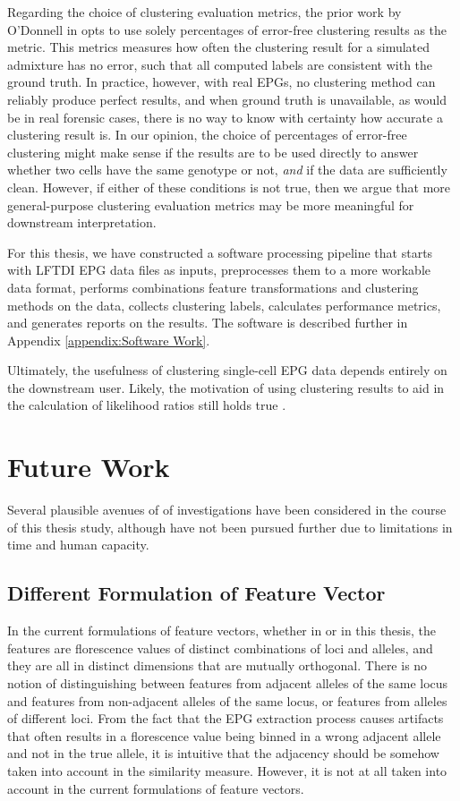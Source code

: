 Regarding the choice of clustering evaluation metrics, the prior work by O'Donnell in \cite{odonnell_clustering_2021} opts to use solely percentages of error-free clustering results as the metric. This metrics measures how often the clustering result for a simulated admixture has no error, such that all computed labels are consistent with the ground truth. In practice, however, with real EPGs, no clustering method can reliably produce perfect results, and when ground truth is unavailable, as would be in real forensic cases, there is no way to know with certainty how accurate a clustering result is. In our opinion, the choice of percentages of error-free clustering might make sense if the results are to be used directly to answer whether two cells have the same genotype or not, \emph{and} if the data are sufficiently clean. However, if either of these conditions is not true, then we argue that more general-purpose clustering evaluation metrics may be more meaningful for downstream interpretation.

For this thesis, we have constructed a software processing pipeline that starts with LFTDI EPG data files as inputs, preprocesses them to a more workable data format, performs combinations feature transformations and clustering methods on the data, collects clustering labels, calculates performance metrics, and generates reports on the results. The software is described further in Appendix \ref{appendix:Software Work}.

Ultimately, the usefulness of clustering single-cell EPG data depends entirely on the downstream user. Likely, the motivation of using clustering results to aid in the calculation of likelihood ratios still holds true \cite{grgicak_large-scale_2020}.

\section{Future Work}

Several plausible avenues of of investigations have been considered in the course of this thesis study, although have not been pursued further due to limitations in time and human capacity.

\subsection{Different Formulation of Feature Vector}

In the current formulations of feature vectors, whether in \cite{odonnell_clustering_2021} or in this thesis, the features are florescence values of distinct combinations of loci and alleles, and they are all in distinct dimensions that are mutually orthogonal. There is no notion of distinguishing between features from adjacent alleles of the same locus and features from non-adjacent alleles of the same locus, or features from alleles of different loci. From the fact that the EPG extraction process causes artifacts that often results in a florescence value being binned in a wrong adjacent allele and not in the true allele, it is intuitive that the adjacency should be somehow taken into account in the similarity measure. However, it is not at all taken into account in the current formulations of feature vectors.

